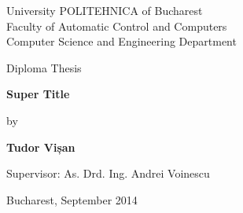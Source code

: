 

\pagestyle{empty}
\sffamily

\noindent
\begin{center}
    \Large
    University POLITEHNICA of Bucharest\\
    Faculty of Automatic Control and Computers \\
    Computer Science and Engineering Department \\
\end{center}

\vfill\vfill
\begin{center}
    \Large
    Diploma Thesis\\
\end{center}

\vfill
\begin{center}
	\HUGE\bfseries
	Super Title\\
\vfill
	\large
	
\end{center}

\vfill
\begin{center}
    \Large
    by
\end{center}

\vfill
\begin{center}
    \huge\bfseries
    Tudor Vișan
\end{center}

\vfill\vfill\vfill
\begin{center}
	\Large
	Supervisor: As. Drd. Ing. Andrei Voinescu\\
\end{center}

\vfill
\begin{center}
\large
    Bucharest, September 2014
\end{center}

\cleardoublepage

\pagestyle{headings}
\tableofcontents

